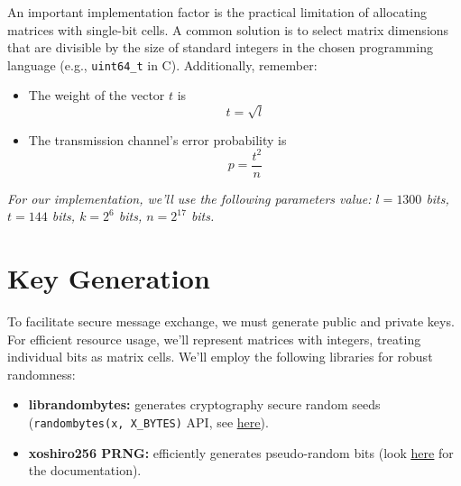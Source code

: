 An important implementation factor is the practical limitation of allocating matrices with 
single-bit cells. A common solution is to select matrix dimensions that are divisible by the 
size of standard integers  in the chosen programming language (e.g., 
\texttt{uint64\_t} in C). 
Additionally, remember:
\begin{itemize}
    \item The weight of the vector $t$ is $$t = \sqrt{l}$$
    \item The transmission channel's  error probability is $$p = \frac{t^2}{n}$$
\end{itemize}

\textit{For our implementation, we'll use the following parameters value: 
$l = 1300$ bits, $t = 144$ bits, $k = 2^{6}$ bits, $n = 2^{17}$ bits.}
%
\section{Key Generation}

To facilitate secure message exchange, we must generate public and private keys. 
For efficient resource usage, we'll represent matrices with integers, 
treating individual bits as matrix cells. We'll employ the following 
libraries for robust randomness:
\begin{itemize}
    \item \textbf{librandombytes:} generates cryptography secure random seeds (\texttt{randombytes(x, X\_BYTES)} API, see 
    \href{https://randombytes.cr.yp.to/index.html}{\underline{here}}).
    \item \textbf{xoshiro256 PRNG:} efficiently generates pseudo-random bits (look \href{https://prng.di.unimi.it}{\underline{here}} for the documentation).
\end{itemize}

